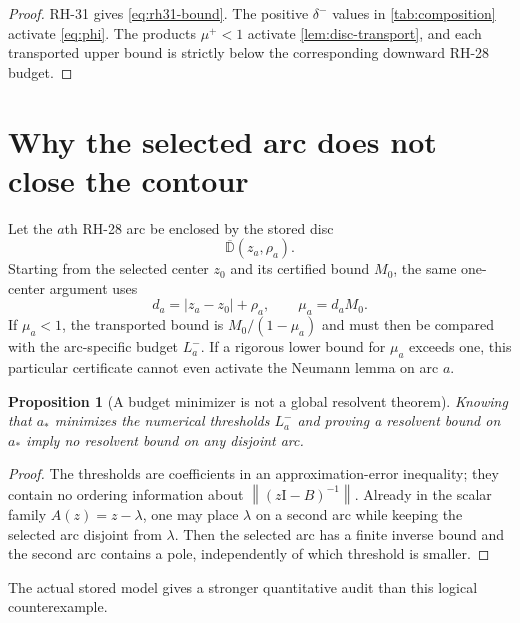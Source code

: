 \documentclass[11pt]{article}
\newtheorem{proposition}[theorem]{Proposition}
\theoremstyle{definition}
\theoremstyle{remark}
\newcommand{\Id}{\mathrm I}
\newcommand{\D}{\mathbb D}
\newcommand{\norm}[1]{\left\lVert#1\right\rVert}
\begin{document}
\begin{proof}
RH-31 gives \cref{eq:rh31-bound}.  The positive $\delta^-$ values in
\cref{tab:composition} activate \cref{eq:phi}.  The products $\mu^+<1$
activate \cref{lem:disc-transport}, and each transported upper bound is
strictly below the corresponding downward RH-28 budget.
\end{proof}


\section{Why the selected arc does not close the contour}
\label{sec:locality}

Let the $a$th RH-28 arc be enclosed by the stored disc
\begin{equation}
 \overline{\D}(z_a,\rho_a).
 \label{eq:arc-disc}
\end{equation}
Starting from the selected center $z_0$ and its certified bound $M_0$, the
same one-center argument uses
\begin{equation}
 d_a=|z_a-z_0|+\rho_a,
 \qquad
 \mu_a=d_aM_0.
 \label{eq:arc-distance}
\end{equation}
If $\mu_a<1$, the transported bound is
$M_0/(1-\mu_a)$ and must then be compared with the arc-specific budget
$L_a^-$.  If a rigorous lower bound for $\mu_a$ exceeds one, this particular
certificate cannot even activate the Neumann lemma on arc $a$.

\begin{proposition}[A budget minimizer is not a global resolvent theorem]
\label{prop:budget-not-resolvent}
Knowing that $a_*$ minimizes the numerical thresholds $L_a^-$ and proving a
resolvent bound on $a_*$ imply no resolvent bound on any disjoint arc.
\end{proposition}

\begin{proof}
The thresholds are coefficients in an approximation-error inequality; they
contain no ordering information about $\norm{(z\Id-B)^{-1}}$.  Already in
the scalar family $A(z)=z-\lambda$, one may place $\lambda$ on a second arc
while keeping the selected arc disjoint from $\lambda$.  Then the selected
arc has a finite inverse bound and the second arc contains a pole,
independently of which threshold is smaller.
\end{proof}

The actual stored model gives a stronger quantitative audit than this
logical counterexample.
\end{document}
